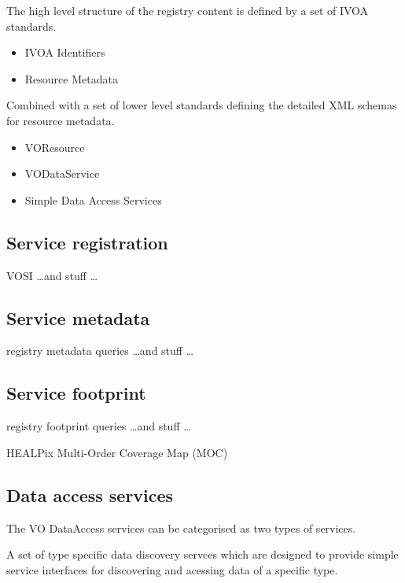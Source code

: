 \documentclass{article}
\begin{document}
The high level structure of the registry content is defined by a
set of IVOA standards.
\begin{itemize}
  \item IVOA Identifiers
  \item Resource Metadata
\end{itemize}

Combined with a set of lower level standards defining the detailed XML schemas
for resource metadata.
\begin{itemize}
  \item VOResource
  \item VODataService
  \item Simple Data Access Services
\end{itemize}

\subsection{Service registration}

VOSI \ldots and stuff \ldots

\subsection{Service metadata}

registry metadata queries \ldots and stuff \ldots

\subsection{Service footprint}

registry footprint queries \ldots and stuff \ldots

HEALPix Multi-Order Coverage Map (MOC)

\subsection{Data access services}

The VO DataAccess services can be categorised as two types of services.

A set of type specific data discovery servces which are designed to provide
simple service interfaces for discovering and acessing data of a specific type.
\end{document}
